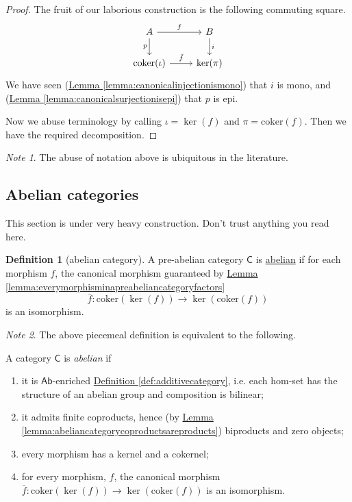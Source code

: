 \documentclass[a4paper,10pt]{scrreprt}
\newcommand{\defn}[1]{\ul{#1}}
\newcommand{\coker}{\mathrm{coker}}
\theoremstyle{definition}
\newtheorem{definition}{Definition}[section]
\theoremstyle{plain}
\theoremstyle{remark}
\newtheorem{note}{Note}[section]
\begin{document}
\begin{proof}
  The fruit of our laborious construction is the following commuting square.
  \begin{equation*}
    \begin{tikzcd}
      A
      \arrow[r, "f"]
      \arrow[d, swap, "p"]
      & B
      \arrow[d, "i"]
      \\
      \coker(\iota)
      \arrow[r, "\bar{f}"]
      & \ker(\pi)
    \end{tikzcd}
  \end{equation*}
  We have seen (\hyperref[lemma:canonicalinjectionismono]{Lemma \ref*{lemma:canonicalinjectionismono}}) that $i$ is mono, and (\hyperref[lemma:canonicalsurjectionisepi]{Lemma \ref*{lemma:canonicalsurjectionisepi}}) that $p$ is epi. 

  Now we abuse terminology by calling $\iota = \ker(f)$ and $\pi = \coker(f)$. Then we have the required decomposition.
\end{proof} 

\begin{note}
  The abuse of notation above is ubiquitous in the literature.
\end{note}

\subsection{Abelian categories}
This section is under very heavy construction. Don't trust anything you read here.
\begin{definition}[abelian category]
  \label{def:abeliancategory}
  A pre-abelian category $\mathsf{C}$ is \defn{abelian} if for each morphism $f$, the canonical morphism guaranteed by \hyperref[lemma:everymorphisminapreabeliancategoryfactors]{Lemma \ref*{lemma:everymorphisminapreabeliancategoryfactors}}
  \begin{equation*}
    \bar{f}\colon \coker(\ker(f)) \to \ker(\coker(f))
  \end{equation*}
  is an isomorphism.
\end{definition}

\begin{note}
  The above piecemeal definition is equivalent to the following.

  A category $\mathsf{C}$ is \emph{abelian} if 
  \begin{enumerate}
    \item it is $\mathsf{Ab}$-enriched \hyperref[def:additivecategory]{Definition \ref*{def:additivecategory}}, i.e. each hom-set has the structure of an abelian group and composition is bilinear;
    \item it admits finite coproducts, hence (by \hyperref[lemma:abeliancategorycoproductsareproducts]{Lemma \ref*{lemma:abeliancategorycoproductsareproducts}}) biproducts and zero objects;
    \item every morphism has a kernel and a cokernel;
    \item for every morphism, $f$, the canonical morphism $\bar{f}\colon \coker(\ker(f)) \to \ker(\coker(f))$ is an isomorphism.
  \end{enumerate}
\end{note}
\end{document}
